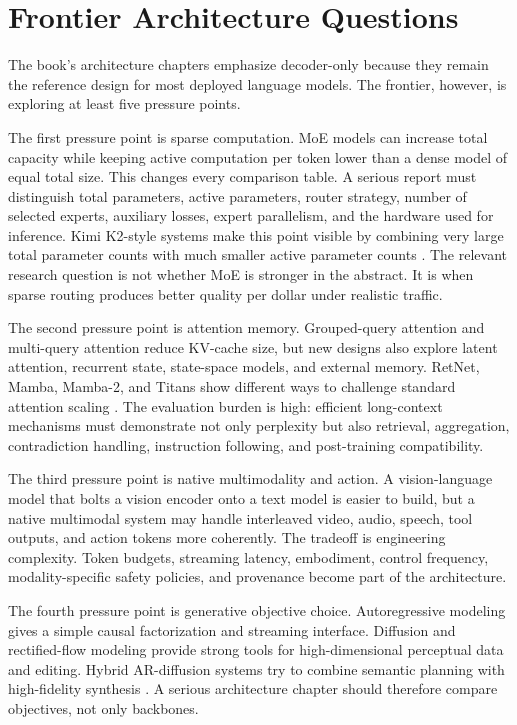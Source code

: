 \section{Frontier Architecture Questions}
\label{sec:frontier-architecture-questions}

The book's architecture chapters emphasize decoder-only \transformers because they remain the reference design for most deployed language models. The frontier, however, is exploring at least five pressure points.

The first pressure point is sparse computation. MoE models can increase total capacity while keeping active computation per token lower than a dense model of equal total size. This changes every comparison table. A serious report must distinguish total parameters, active parameters, router strategy, number of selected experts, auxiliary losses, expert parallelism, and the hardware used for inference. Kimi K2-style systems make this point visible by combining very large total parameter counts with much smaller active parameter counts \cite{kimi2025k2}. The relevant research question is not whether MoE is stronger in the abstract. It is when sparse routing produces better quality per dollar under realistic traffic.

The second pressure point is attention memory. Grouped-query attention and multi-query attention reduce KV-cache size, but new designs also explore latent attention, recurrent state, state-space models, and external memory. RetNet, Mamba, Mamba-2, and Titans show different ways to challenge standard attention scaling \cite{sun2023retnet,gu2023mamba,dao2024mamba2,behrouz2025titans}. The evaluation burden is high: efficient long-context mechanisms must demonstrate not only perplexity but also retrieval, aggregation, contradiction handling, instruction following, and post-training compatibility.

The third pressure point is native multimodality and action. A vision-language model that bolts a vision encoder onto a text model is easier to build, but a native multimodal system may handle interleaved video, audio, speech, tool outputs, and action tokens more coherently. The tradeoff is engineering complexity. Token budgets, streaming latency, embodiment, control frequency, modality-specific safety policies, and provenance become part of the architecture.

The fourth pressure point is generative objective choice. Autoregressive modeling gives a simple causal factorization and streaming interface. Diffusion and rectified-flow modeling provide strong tools for high-dimensional perceptual data and editing. Hybrid AR-diffusion systems try to combine semantic planning with high-fidelity synthesis \cite{peebles2023dit,esser2024rectifiedflow,shen2025mammothmoda2}. A serious architecture chapter should therefore compare objectives, not only backbones.

